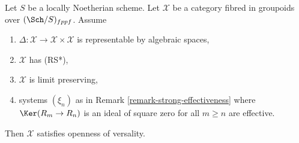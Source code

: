 \begin{lemma}
\label{lemma-SGE-implies-openness-versality}
Let $S$ be a locally Noetherian scheme. Let $\mathcal{X}$ be a category fibred
in groupoids over $(\Sch/S)_{fppf}$. Assume
\begin{enumerate}
\item $\Delta : \mathcal{X} \to \mathcal{X} \times \mathcal{X}$ is
representable by algebraic spaces,
\item $\mathcal{X}$ has (RS*),
\item $\mathcal{X}$ is limit preserving,
\item systems $(\xi_n)$ as in Remark \ref{remark-strong-effectiveness}
where $\Ker(R_m \to R_n)$ is an ideal of square zero for all $m \geq n$
are effective.
\end{enumerate}
Then $\mathcal{X}$ satisfies openness of versality.
\end{lemma}

